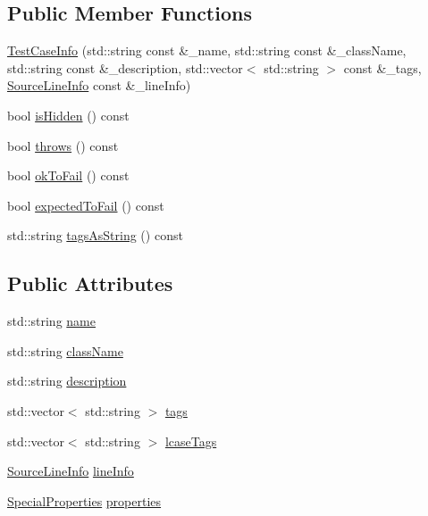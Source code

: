 \subsection*{Public Member Functions}
\begin{DoxyCompactItemize}
\item 
\mbox{\hyperlink{struct_catch_1_1_test_case_info_ad1a6b08b5a83d1c5eb4596b727b5305f}{Test\+Case\+Info}} (std\+::string const \&\+\_\+name, std\+::string const \&\+\_\+class\+Name, std\+::string const \&\+\_\+description, std\+::vector$<$ std\+::string $>$ const \&\+\_\+tags, \mbox{\hyperlink{struct_catch_1_1_source_line_info}{Source\+Line\+Info}} const \&\+\_\+line\+Info)
\item 
bool \mbox{\hyperlink{struct_catch_1_1_test_case_info_a934b1a0952700743e99d62ec1731a2e2}{is\+Hidden}} () const
\item 
bool \mbox{\hyperlink{struct_catch_1_1_test_case_info_afc70d4379a2070cc22b693ffe3932c1a}{throws}} () const
\item 
bool \mbox{\hyperlink{struct_catch_1_1_test_case_info_a5f37291295e3a6de2dd85324c941edaf}{ok\+To\+Fail}} () const
\item 
bool \mbox{\hyperlink{struct_catch_1_1_test_case_info_abe33d81233230cdae8afa714688e905b}{expected\+To\+Fail}} () const
\item 
std\+::string \mbox{\hyperlink{struct_catch_1_1_test_case_info_a17506de67fb18e27511c17f8a81119d8}{tags\+As\+String}} () const
\end{DoxyCompactItemize}
\subsection*{Public Attributes}
\begin{DoxyCompactItemize}
\item 
std\+::string \mbox{\hyperlink{struct_catch_1_1_test_case_info_a463794e2f5cfead307c93efd134ade36}{name}}
\item 
std\+::string \mbox{\hyperlink{struct_catch_1_1_test_case_info_a1a5e0825132a38d091defdebbf2f8ce9}{class\+Name}}
\item 
std\+::string \mbox{\hyperlink{struct_catch_1_1_test_case_info_a37fe2db9425bc45f6a33893eac31198e}{description}}
\item 
std\+::vector$<$ std\+::string $>$ \mbox{\hyperlink{struct_catch_1_1_test_case_info_a150a7cbca1dd0c91799ccb14ff822eb0}{tags}}
\item 
std\+::vector$<$ std\+::string $>$ \mbox{\hyperlink{struct_catch_1_1_test_case_info_a844e3de9baf6e53cadfba9733c236bfe}{lcase\+Tags}}
\item 
\mbox{\hyperlink{struct_catch_1_1_source_line_info}{Source\+Line\+Info}} \mbox{\hyperlink{struct_catch_1_1_test_case_info_aa9407b7f442655b51a2aad24b3fa2fd3}{line\+Info}}
\item 
\mbox{\hyperlink{struct_catch_1_1_test_case_info_a39b232f74b4a7a6f2183b96759027eac}{Special\+Properties}} \mbox{\hyperlink{struct_catch_1_1_test_case_info_afc1e84bd7a2e180895a06d9131302af0}{properties}}
\end{DoxyCompactItemize}
